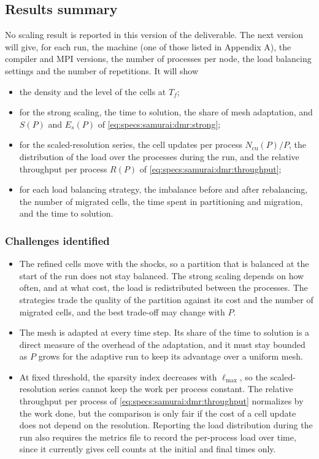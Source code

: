 \subsection{Results summary}

No scaling result is reported in this version of the deliverable. The next
version will give, for each run, the machine (one of those listed in Appendix A),
the compiler and MPI versions, the number of processes per node, the load
balancing settings and the number of repetitions. It will show
\begin{itemize}
\item the density and the level of the cells at $T_f$;
\item for the strong scaling, the time to solution, the share of mesh
  adaptation, and $S(P)$ and $E_s(P)$ of \eqref{eq:specs:samurai:dmr:strong};
\item for the scaled-resolution series, the cell updates per process
  $N_{\mathrm{cu}}(P)/P$, the distribution of the load over the processes
  during the run, and the relative throughput per process $R(P)$ of
  \eqref{eq:specs:samurai:dmr:throughput};
\item for each load balancing strategy, the imbalance before and after
  rebalancing, the number of migrated cells, the time spent in partitioning and
  migration, and the time to solution.
\end{itemize}




\subsubsection{Challenges identified}

\begin{itemize}
\item The refined cells move with the shocks, so a partition that is balanced
  at the start of the run does not stay balanced. The strong scaling depends on
  how often, and at what cost, the load is redistributed between the processes.
  The strategies trade the quality of the partition against its cost and the
  number of migrated cells, and the best trade-off may change with $P$.
\item The mesh is adapted at every time step. Its share of the time to
  solution is a direct measure of the overhead of the adaptation, and it must
  stay bounded as $P$ grows for the adaptive run to keep its advantage over a
  uniform mesh.
\item At fixed threshold, the sparsity index decreases with $\ell_{\max}$, so
  the scaled-resolution series cannot keep the work per process constant. The
  relative throughput per process of \eqref{eq:specs:samurai:dmr:throughput}
  normalizes by the work done, but the comparison is only fair if the cost of
  a cell update does not depend on the resolution. Reporting the load distribution
  during the run also requires the metrics file to record the per-process load
  over time, since it currently gives cell counts at the initial and final
  times only.
\end{itemize}
